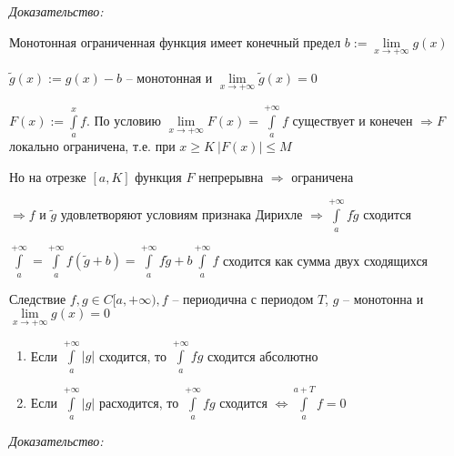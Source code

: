 \documentclass[12pt]{article}
\begin{document}
\textit{Доказательство:}

Монотонная ограниченная функция имеет конечный предел $b := \lim\limits_{x \to + \infty} g(x)$

$\tilde{g}(x) := g(x) - b$ -- монотонная и $\lim\limits_{x \to + \infty} \tilde{g}(x) = 0$

$F(x) := \int\limits_a^x f$. По условию $\lim\limits_{x \to + \infty} F(x) = \int\limits_a^{+ \infty} f$ существует и конечен $\Rightarrow F$ локально ограничена, т.е. при $x \geq K\ |F(x)| \leq M$

Но на отрезке $[a, K]$ функция $F$ непрерывна $\Rightarrow$ ограничена

$\Rightarrow f$ и $\tilde{g}$ удовлетворяют условиям признака Дирихле $\Rightarrow \int\limits_a^{+ \infty} f\tilde{g}$ сходится

$\int\limits_a^{+ \infty} = \int\limits_a^{+ \infty} f(\tilde{g} + b) = \int\limits_a^{+ \infty} f\tilde{g} + b\int\limits_a^{+ \infty} f$ сходится как сумма двух сходящихся

\begin{theo}{Следствие}
    $f, g \in C[a, + \infty), f$ -- периодична с периодом $T$, $g$ -- монотонна и $\lim\limits_{x \to + \infty} g(x) = 0$

    \begin{enumerate}
        \item Если $\int\limits_a^{+ \infty} |g|$ сходится, то $\int\limits_a^{+ \infty} fg$ сходится абсолютно
        \item Если $\int\limits_a^{+ \infty} |g|$ расходится, то $\int\limits_a^{+ \infty} fg$ сходится $\Leftrightarrow \int\limits_a^{a + T} f = 0$
    \end{enumerate}
\end{theo}

\textit{Доказательство:}
\end{document}
